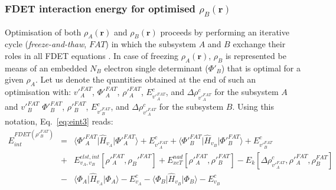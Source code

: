 \documentclass[journal=jctcce,manuscript=article]{achemso}
\begin{document}
 \subsubsection{FDET interaction energy for  optimised $\rho_B(\mathbf{r})$}
Optimisation of both $\rho_A(\mathbf{r})$ and $\rho_B(\mathbf{r})$  proceeds by performing an iterative cycle (\textit{freeze-and-thaw}, $FAT$) in which the
subsystem $A$ and $B$ exchange their roles  in all FDET equations \cite{Wesolowski1996a}. 
In case of freezing $\rho_A(\mathbf{r})$,  $\rho_B$ is represented be means of an embedded $N_B$ electron single determinant ($\Phi'_B$) that is optimal  for a given $\rho_A$. Let us denote the quantities obtained at the end of such an optimisation with: $v'^{FAT}_A$, $\Phi'^{FAT}_A$, $\rho'^{FAT}_A$, 
 $E^{c}_{v'^{FAT}_A}$, and $\Delta \rho^{c}_{v'^{FAT}_A}$  for the subsystem $A$ and
 $v'^{FAT}_B$ $\Phi'^{FAT}_B$, $\rho'^{FAT}_B$, 
 $E^{c}_{v'^{FAT}_B}$, and $\Delta \rho^{c}_{v'^{FAT}_A}$  for the subsystem $B$. Using this notation, Eq.~\ref{eq:eint3} reads: 
 \begin{eqnarray}
E_{int}^{FDET(\rho'^{FAT}_B)} 
&=&  \langle\Phi'^{FAT}_{A}\vert \hat{H}_{v_A}\vert \Phi'^{FAT}_{A}\rangle + E^{c}_{v'^{FAT}_A} + \langle\Phi'^{FAT}_{B}\vert \hat{H}_{v_B}\vert \Phi'^{FAT}_{B}\rangle  + E^{c}_{v'^{FAT}_B} \label{eq:eint4A}\\ \nonumber
&+& E^{elst,int}_{v_A,v_B}[\rho'^{FAT}_A,\rho_B'^{FAT}] + {E}_{xcT}^{nad}[\rho'^{FAT}_A,\rho'^{FAT}_B]-     E_k[\Delta \rho^{c}_{v'^{FAT}_A}, \rho'^{FAT}_A, \rho^{FAT}_B]  \nonumber\\
&-& 
\langle\Phi_{A}\vert \hat{H}_{v_A}\vert \Phi_{A}\rangle - E^{c}_{v_A}
- \langle\Phi_{B}\vert \hat{H}_{v_B}\vert \Phi_{B}\rangle - E^{c}_{v_B}\nonumber
\end{eqnarray}
\end{document}
